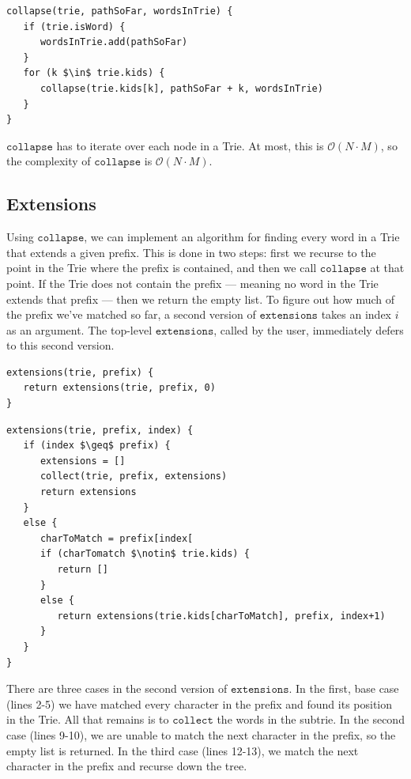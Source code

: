 \documentclass[a4paper,12pt]{article}
\newcommand{\kwa}[1]{\mathtt{#1}}
\begin{document}
\begin{lstlisting}
collapse(trie, pathSoFar, wordsInTrie) {
   if (trie.isWord) {
      wordsInTrie.add(pathSoFar)
   }
   for (k $\in$ trie.kids) {
      collapse(trie.kids[k], pathSoFar + k, wordsInTrie)
   }
}
\end{lstlisting}

\noindent
$\kwa{collapse}$ has to iterate over each node in a Trie. At most, this is $\mathcal{O}(N \cdot M)$, so the complexity of $\kwa{collapse}$ is $\mathcal{O}(N \cdot M)$.


\subsection{Extensions}

\noindent
Using $\kwa{collapse}$, we can implement an algorithm for finding every word in a Trie that extends a given prefix. This is done in two steps: first we recurse to the point in the Trie where the prefix is contained, and then we call $\kwa{collapse}$ at that point. If the Trie does not contain the prefix --- meaning no word in the Trie extends that prefix --- then we return the empty list. To figure out how much of the prefix we've matched so far, a second version of $\kwa{extensions}$ takes an index $i$ as an argument. The top-level $\kwa{extensions}$, called by the user, immediately defers to this second version.

\begin{lstlisting}
extensions(trie, prefix) {
   return extensions(trie, prefix, 0)
}
\end{lstlisting}

\begin{lstlisting}
extensions(trie, prefix, index) {
   if (index $\geq$ prefix) {
      extensions = []
      collect(trie, prefix, extensions)
      return extensions
   }
   else {
      charToMatch = prefix[index[
      if (charTomatch $\notin$ trie.kids) {
         return []
      }
      else {
         return extensions(trie.kids[charToMatch], prefix, index+1)
      }
   }
}
\end{lstlisting}

\noindent
There are three cases in the second version of $\kwa{extensions}$. In the first, base case (lines 2-5) we have matched every character in the prefix and found its position in the Trie. All that remains is to $\kwa{collect}$ the words in the subtrie. In the second case (lines 9-10), we are unable to match the next character in the prefix, so the empty list is returned. In the third case (lines 12-13), we match the next character in the prefix and recurse down the tree. \\
\end{document}
